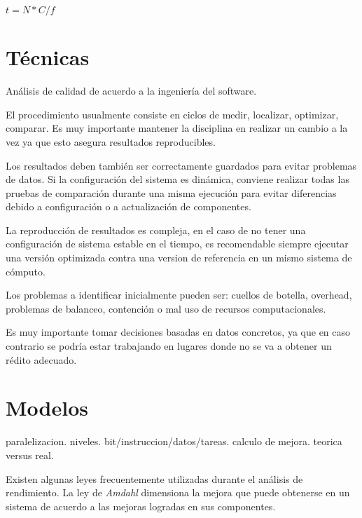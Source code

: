 \documentclass[a4paper]{report}
\begin{document}
\bigskip

$ t = N * C / f $

\section{T\'ecnicas}

An\'alisis de calidad de acuerdo a la ingenier\'ia del software.

\bigskip

El procedimiento usualmente consiste en ciclos de medir, localizar, optimizar,
comparar. Es muy importante mantener la disciplina en realizar un cambio a la
vez ya que esto asegura resultados reproducibles.

\bigskip

Los resultados deben tambi\'en ser correctamente guardados para evitar
problemas de datos. Si la configuraci\'on del sistema es din\'amica, conviene
realizar todas las pruebas de comparaci\'on durante una misma ejecuci\'on para
evitar diferencias debido a configuraci\'on o a actualizaci\'on de componentes.

\bigskip

La reproducci\'on de resultados es compleja, en el caso de no tener una
configuraci\'on de sistema estable en el tiempo, es recomendable siempre
ejecutar una versi\'on optimizada contra una version de referencia en un mismo
sistema de c\'omputo.

\bigskip

Los problemas a identificar inicialmente pueden ser: cuellos de botella,
overhead, problemas de balanceo, contenci\'on o mal uso de recursos
computacionales.

\bigskip

Es muy importante tomar decisiones basadas en datos concretos, ya que en
caso contrario se podr\'ia estar trabajando en lugares donde no se va a obtener
un r\'edito adecuado.

\section{Modelos}

paralelizacion. niveles. bit/instruccion/datos/tareas.
calculo de mejora. teorica versus real. 

\bigskip

Existen algunas leyes frecuentemente utilizadas durante el an\'alisis de
rendimiento. La ley de {\it Amdahl} \cite{amdahl} dimensiona la mejora que
puede obtenerse en un sistema de acuerdo a las mejoras logradas en sus
componentes.
\end{document}
